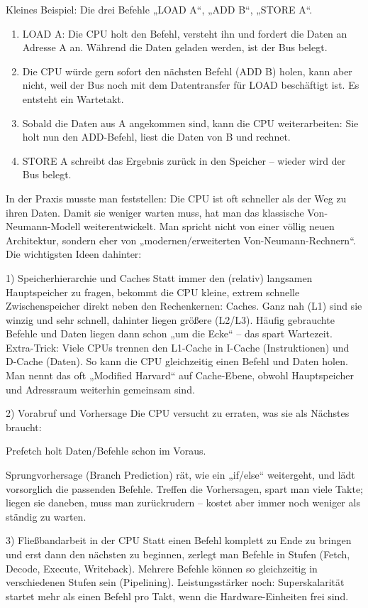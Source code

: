 \documentclass[../skript/main.tex]{subfiles}
\begin{document}
Kleines Beispiel: Die drei Befehle „LOAD A“, „ADD B“, „STORE A“.

\begin{enumerate}
	\item LOAD A: Die CPU holt den Befehl, versteht ihn und fordert die Daten an Adresse A an. Während die Daten geladen werden, ist der Bus belegt.
	\item Die CPU würde gern sofort den nächsten Befehl (ADD B) holen, kann aber nicht, weil der Bus noch mit dem Datentransfer für LOAD beschäftigt ist. Es entsteht ein Wartetakt.
	\item Sobald die Daten aus A angekommen sind, kann die CPU weiterarbeiten: Sie holt nun den ADD-Befehl, liest die Daten von B und rechnet.
	\item STORE A schreibt das Ergebnis zurück in den Speicher – wieder wird der Bus belegt.
\end{enumerate}

In der Praxis musste man feststellen: Die CPU ist oft schneller als der Weg zu ihren Daten. Damit sie weniger warten muss, hat man das klassische Von-Neumann-Modell weiterentwickelt. Man spricht nicht von einer völlig neuen Architektur, sondern eher von „modernen/erweiterten Von-Neumann-Rechnern“. Die wichtigsten Ideen dahinter:

1) Speicherhierarchie und Caches
Statt immer den (relativ) langsamen Hauptspeicher zu fragen, bekommt die CPU kleine, extrem schnelle Zwischenspeicher direkt neben den Rechenkernen: Caches. Ganz nah (L1) sind sie winzig und sehr schnell, dahinter liegen größere (L2/L3). Häufig gebrauchte Befehle und Daten liegen dann schon „um die Ecke“ – das spart Wartezeit.
Extra-Trick: Viele CPUs trennen den L1-Cache in I-Cache (Instruktionen) und D-Cache (Daten). So kann die CPU gleichzeitig einen Befehl und Daten holen. Man nennt das oft „Modified Harvard“ auf Cache-Ebene, obwohl Hauptspeicher und Adressraum weiterhin gemeinsam sind.

2) Vorabruf und Vorhersage
Die CPU versucht zu erraten, was sie als Nächstes braucht:

Prefetch holt Daten/Befehle schon im Voraus.

Sprungvorhersage (Branch Prediction) rät, wie ein „if/else“ weitergeht, und lädt vorsorglich die passenden Befehle.
Treffen die Vorhersagen, spart man viele Takte; liegen sie daneben, muss man zurückrudern – kostet aber immer noch weniger als ständig zu warten.

3) Fließbandarbeit in der CPU
Statt einen Befehl komplett zu Ende zu bringen und erst dann den nächsten zu beginnen, zerlegt man Befehle in Stufen (Fetch, Decode, Execute, Writeback). Mehrere Befehle können so gleichzeitig in verschiedenen Stufen sein (Pipelining).
Leistungsstärker noch: Superskalarität startet mehr als einen Befehl pro Takt, wenn die Hardware-Einheiten frei sind.
\end{document}
